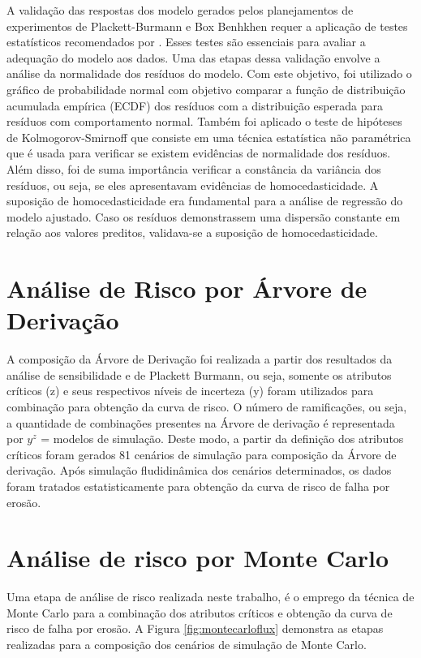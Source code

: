 A validação das respostas dos modelo gerados pelos planejamentos de experimentos de Plackett-Burmann e Box Benhkhen requer a aplicação de testes estatísticos recomendados por \cite{montgomery}. Esses testes são essenciais para avaliar a adequação do modelo aos dados. Uma das etapas dessa validação envolve a análise da normalidade dos resíduos do modelo. Com este objetivo, foi utilizado o gráfico de probabilidade normal com objetivo comparar a função de distribuição acumulada empírica (ECDF) dos resíduos com a distribuição esperada para resíduos com comportamento normal. Também foi aplicado o teste de hipóteses de Kolmogorov-Smirnoff que consiste em uma técnica estatística não paramétrica que é usada para verificar se existem evidências de normalidade dos resíduos. Além disso, foi de suma importância verificar a constância da variância dos resíduos, ou seja, se eles apresentavam evidências de homocedasticidade. A suposição de homocedasticidade era fundamental para a análise de regressão do modelo ajustado. Caso os resíduos demonstrassem uma dispersão constante em relação aos valores preditos, validava-se a suposição de homocedasticidade.


\section{Análise de Risco por Árvore de Derivação}

A composição da Árvore de Derivação foi realizada a partir dos resultados da análise de sensibilidade e de Plackett Burmann, ou seja, somente os atributos críticos (z) e seus respectivos níveis de incerteza (y) foram utilizados para combinação para obtenção da curva de risco. O número de ramificações, ou seja, a quantidade de combinações presentes na Árvore de derivação é representada por $y^z$ = modelos de simulação. Deste modo, a partir da definição dos atributos críticos foram gerados 81 cenários de simulação para composição da Árvore de derivação. Após simulação fludidinâmica dos cenários determinados, os dados foram tratados estatisticamente para obtenção da curva de risco de falha por erosão.


\section{Análise de risco por Monte Carlo}


Uma etapa de análise de risco realizada neste trabalho, é o emprego da técnica de
Monte Carlo para a combinação dos atributos críticos e obtenção da curva de risco de falha por erosão. A Figura \ref{fig:montecarloflux} demonstra as etapas realizadas para a composição dos cenários de simulação de Monte Carlo.


